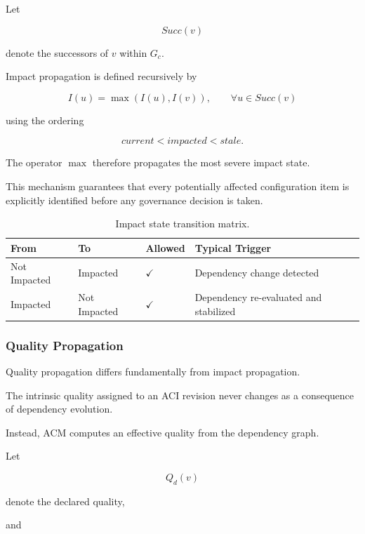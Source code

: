 \documentclass[10pt]{article}
\begin{document}
Let

\[
Succ(v)
\]

denote the successors of
$v$
within
$G_c$.

Impact propagation is defined recursively by

\begin{equation}
	I(u)
	=
	\max
	\left(
	I(u),
	I(v)
	\right),
	\qquad
	\forall
	u\in Succ(v)
	\label{eq:impact_propagation}
\end{equation}

using the ordering

\[
current
<
impacted
<
stale.
\]

The operator
$\max$
therefore propagates the most severe impact state.

This mechanism guarantees that every potentially affected configuration item is
explicitly identified before any governance decision is taken.

\begin{table}[ht]
	\caption{Impact state transition matrix.}
	\label{tab:impact_transition_matrix}
	\centering
	\small
	\begin{tabular}{llll}
		\toprule
		\textbf{From} & \textbf{To} & \textbf{Allowed} & \textbf{Typical Trigger} \\
		\midrule
		Not Impacted & Impacted & $\checkmark$ & Dependency change detected \\
		Impacted & Not Impacted & $\checkmark$ & Dependency re-evaluated and stabilized \\
		\bottomrule
	\end{tabular}
\end{table}

\subsubsection{Quality Propagation}

Quality propagation differs fundamentally from impact propagation.

The intrinsic quality assigned to an ACI revision never changes as a
consequence of dependency evolution.

Instead, ACM computes an effective quality from the dependency graph.

Let

\[
Q_d(v)
\]

denote the declared quality,

and
\end{document}
